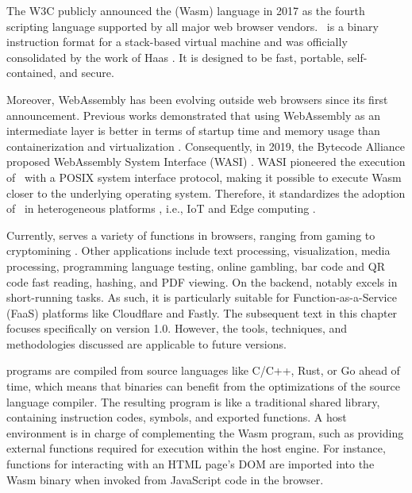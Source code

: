 \msection{\Wasm}
\label{sota:wasm}
The W3C publicly announced the \Wasm(Wasm) language in 2017 as the fourth scripting language supported by all major web browser vendors.
\Wasm\ is a binary instruction format for a stack-based virtual machine and was officially consolidated by the work of Haas \etal \cite{Haas_2017}. 
It is designed to be fast, portable, self-contained, and secure.


Moreover, WebAssembly has been evolving outside web browsers since its first announcement.
Previous works demonstrated that using WebAssembly as an intermediate layer is better in terms of startup time and memory usage than containerization and virtualization \cite{pMendkiServerless, 1244493Jacobsson}. 
Consequently, in 2019, the Bytecode Alliance proposed WebAssembly System Interface (WASI) \cite{WASI}. 
WASI pioneered the execution of \Wasm\ with a POSIX system interface protocol, making it possible to execute Wasm closer to the underlying operating system. 
Therefore, it standardizes the adoption of \Wasm\ in heterogeneous platforms \cite{bryant2020webassembly}, i.e., IoT and Edge computing \cite{9640153, wen2020wasmachine}.

Currently, \Wasm serves a variety of functions in browsers, ranging from gaming to cryptomining \cite{Hilbig2021AnES}. 
Other applications include text processing, visualization, media processing, programming language testing, online gambling, bar code and QR code fast reading, hashing, and PDF viewing. 
On the backend, \Wasm notably excels in short-running tasks. 
As such, it is particularly suitable for Function-as-a-Service (FaaS) platforms like Cloudflare and Fastly.
The subsequent text in this chapter focuses specifically on \Wasm version 1.0. 
However, the tools, techniques, and methodologies discussed are applicable to future \Wasm versions.



\Wasm programs are compiled from source languages like C/C++, Rust, or Go ahead of time, which means that \wasm binaries can benefit from the optimizations of the source language compiler.
The resulting \Wasm program is like a traditional shared library, containing instruction codes, symbols, and exported functions. 
A host environment is in charge of complementing the Wasm program, such as providing external functions required for execution within the host engine. 
For instance, functions for interacting with an HTML page's DOM are imported into the Wasm binary when invoked from JavaScript code in the browser. 

